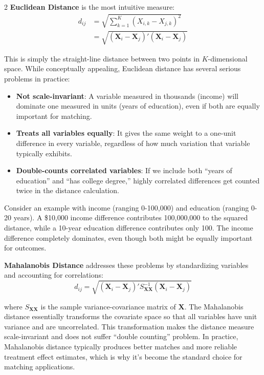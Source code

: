 \documentclass[12pt]{article}
\begin{document}
\begin{multicols}{2}
\textbf{Euclidean Distance} is the most intuitive measure:
\begin{align*}
  d_{ij} 
  &= \sqrt{\sum_{k=1}^K (X_{i,k} - X_{j,k})^2} \\
  &= \sqrt{(\bm{X}_i - \bm{X}_j)'(\bm{X}_i - \bm{X}_j)}
\end{align*}

This is simply the straight-line distance between two points in $K$-dimensional space.
While conceptually appealing, Euclidean distance has several serious problems in practice:

\begin{itemize}
  \item \textbf{Not scale-invariant}: A variable measured in thousands (income) will dominate one measured in units (years of education), even if both are equally important for matching.
  
  \item \textbf{Treats all variables equally}: It gives the same weight to a one-unit difference in every variable, regardless of how much variation that variable typically exhibits.
  
  \item \textbf{Double-counts correlated variables}: If we include both ``years of education'' and ``has college degree,'' highly correlated differences get counted twice in the distance calculation.
\end{itemize}

Consider an example with income (ranging 0-100,000) and education (ranging 0-20 years).
A \$10,000 income difference contributes 100,000,000 to the squared distance, while a 10-year education difference contributes only 100.
The income difference completely dominates, even though both might be equally important for outcomes.

\textbf{Mahalanobis Distance} addresses these problems by standardizing variables and accounting for correlations:
$$d_{ij} = \sqrt{(\bm{X}_i - \bm{X}_j)' S_{\bm{X}\bm{X}}^{-1} (\bm{X}_i - \bm{X}_j)}$$

where $S_{\bm{X}\bm{X}}$ is the sample variance-covariance matrix of $\bm{X}$.
The Mahalanobis distance essentially transforms the covariate space so that all variables have unit variance and are uncorrelated.
This transformation makes the distance measure scale-invariant and does not suffer ``double counting'' problem.
In practice, Mahalanobis distance typically produces better matches and more reliable treatment effect estimates, which is why it's become the standard choice for matching applications.




\end{multicols}
\end{document}
